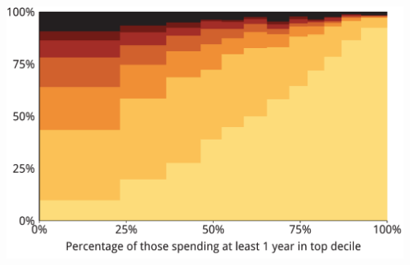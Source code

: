 \documentclass[tikz]{standalone}\usepackage[]{graphicx}\usepackage[]{color}
\newenvironment{knitrout}{}{} %
\begin{document}
\begin{knitrout}
\color{fgcolor}
\includegraphics[width=11.000in,height=7.00in]{./Super-tax-targeting/b5-super-atlas/Figure3-8-marimekko-1} 

\end{knitrout}
\end{document}
